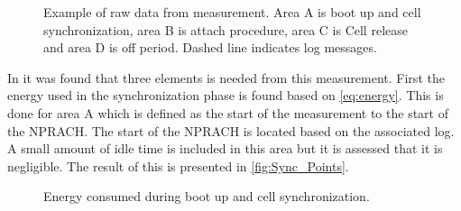 \begin{figure}[H]
\centering
\begin{minipage}[tbp]{0.58\textwidth}
\resizebox{\textwidth}{!}{
}
\end{minipage}%
\begin{minipage}[tbp]{0.39\textwidth}
\end{minipage}
\caption{Example of raw data from measurement. Area A is boot up and cell synchronization, area B is attach procedure, area C is Cell release and area D is off period. Dashed line indicates log messages.}
\label{fig:Attach_raw}
\end{figure}

In  it was found that three elements is needed from this measurement. First the energy used in the synchronization phase is found based on \autoref{eq:energy}. This is done for area A which is defined as the start of the measurement to the start of the NPRACH. The start of the NPRACH is located based on the associated log. A small amount of idle time is included in this area but it is assessed that it is negligible. The result of this is presented in \autoref{fig:Sync_Points}. 



\begin{figure}[H]
\centering
\begin{minipage}{0.48\textwidth}
\resizebox{\textwidth}{!}{
}
\end{minipage}
\hfill
\begin{minipage}{0.48\textwidth}
\resizebox{\textwidth}{!}{
}
\end{minipage}
\caption{Energy consumed during boot up and cell synchronization.}
\label{fig:Sync_Points}
\end{figure}

